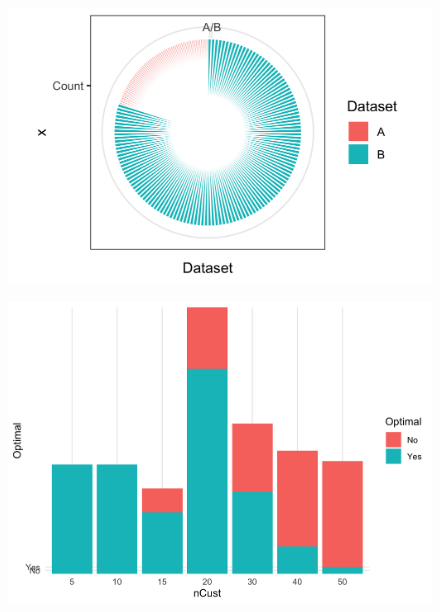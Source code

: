 \documentclass[5p,times]{elsarticle}
\begin{document}
			\begin{figure}
				\begin{center}
					\includegraphics[scale=0.11]{fig/pie_dataset}
					\label{fig:pie1}
				\end{center}
			\end{figure}

			\begin{figure}
				\begin{center}
					\includegraphics[scale=0.11]{fig/barplot}
					\label{fig:barplot}
				\end{center}
			\end{figure}
	
\end{document}
